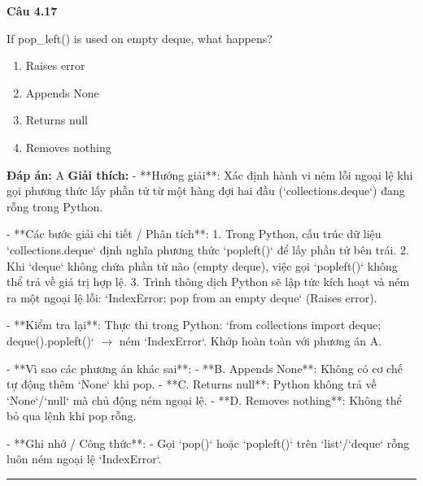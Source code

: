 \documentclass[11pt,a4paper]{article}
\newenvironment{question}[1]{%
  \par\vspace{1em}\noindent\textbf{\large Câu #1}\par\vspace{0.4em}
}{%
  \par\vspace{1em}\hrule\vspace{0.6em}
}
\newenvironment{choices}{%
  \begin{enumerate}[label=\textbf{\Alph*.},leftmargin=2.2em,itemsep=2pt,topsep=3pt]
}{%
  \end{enumerate}
}
\newcommand{\choice}{\item}
\begin{document}
\begin{question}{4.17}
If pop_left() is used on empty deque, what happens?
\begin{choices}
\choice Raises error
\choice Appends None
\choice Returns null
\choice Removes nothing
\end{choices}
\textbf{Đáp án:} A
\textbf{Giải thích:} - **Hướng giải**:
  Xác định hành vi ném lỗi ngoại lệ khi gọi phương thức lấy phần tử từ một hàng đợi hai đầu (`collections.deque`) đang rỗng trong Python.

- **Các bước giải chi tiết / Phân tích**:
  1. Trong Python, cấu trúc dữ liệu `collections.deque` định nghĩa phương thức `popleft()` để lấy phần tử bên trái.
  2. Khi `deque` không chứa phần tử nào (empty deque), việc gọi `popleft()` không thể trả về giá trị hợp lệ.
  3. Trình thông dịch Python sẽ lập tức kích hoạt và ném ra một ngoại lệ lỗi: `IndexError: pop from an empty deque` (Raises error).

- **Kiểm tra lại**:
  Thực thi trong Python: `from collections import deque; deque().popleft()` \(\rightarrow\) ném `IndexError`.
  Khớp hoàn toàn với phương án A.

- **Vì sao các phương án khác sai**:
  - **B. Appends None**: Không có cơ chế tự động thêm `None` khi pop.
  - **C. Returns null**: Python không trả về `None`/`null` mà chủ động ném ngoại lệ.
  - **D. Removes nothing**: Không thể bỏ qua lệnh khi pop rỗng.

- **Ghi nhớ / Công thức**:
  - Gọi `pop()` hoặc `popleft()` trên `list`/`deque` rỗng luôn ném ngoại lệ `IndexError`.
\end{question}
\end{document}
